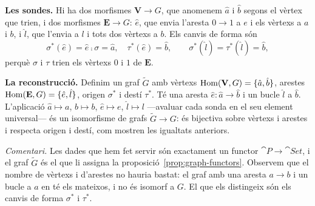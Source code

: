\begin{solucio}
\textbf{Les sondes.} Hi ha dos morfismes $\mathbf V\to G$, que anomenem $\hat a$ i $\hat b$ segons el vèrtex que trien, i dos morfismes $\mathbf E\to G$: $\hat e$, que envia l'aresta $0\to1$ a $e$ i els vèrtexs a $a$ i $b$, i $\hat l$, que l'envia a $l$ i tots dos vèrtexs a $b$. Els canvis de forma són
\[
\sigma^*(\hat e)=\hat e\comp\sigma=\hat a,\quad \tau^*(\hat e)=\hat b,\qquad \sigma^*(\hat l)=\tau^*(\hat l)=\hat b,
\]
perquè $\sigma$ i $\tau$ trien els vèrtexs $0$ i $1$ de $\mathbf E$.

\textbf{La reconstrucció.} Definim un graf $\widetilde G$ amb vèrtexs $\operatorname{Hom}(\mathbf V,G)=\{\hat a,\hat b\}$, arestes $\operatorname{Hom}(\mathbf E,G)=\{\hat e,\hat l\}$, origen $\sigma^*$ i destí $\tau^*$. Té una aresta $\hat e\colon\hat a\to\hat b$ i un bucle $\hat l$ a $\hat b$. L'aplicació $\hat a\mapsto a$, $\hat b\mapsto b$, $\hat e\mapsto e$, $\hat l\mapsto l$ ---avaluar cada sonda en el seu element universal--- és un isomorfisme de grafs $\widetilde G\to G$: és bijectiva sobre vèrtexs i arestes i respecta origen i destí, com mostren les igualtats anteriors.

\emph{Comentari.} Les dades que hem fet servir són exactament un functor $\cat{P}\to\cat{Set}$, i el graf $\widetilde G$ és el que li assigna la proposició~\ref{prop:graph-functors}. Observem que el nombre de vèrtexs i d'arestes no hauria bastat: el graf amb una aresta $a\to b$ i un bucle a $a$ en té els mateixos, i no és isomorf a $G$. El que els distingeix són els canvis de forma $\sigma^*$ i $\tau^*$.
\end{solucio}
